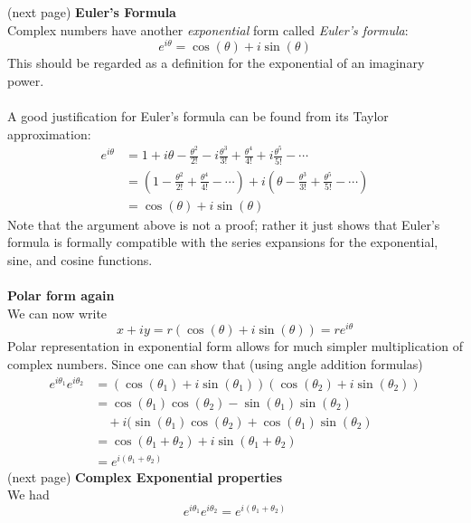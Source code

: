 \documentclass{report}
\begin{document}
(next page)
\newpage
\noindent\textbf{Euler's Formula}\\
Complex numbers have another \textit{exponential} form called \textit{Euler's formula}:
\begin{equation*}
e^{i\theta}=\cos(\theta)+i\sin(\theta)
\end{equation*}
This should be regarded as a definition for the exponential of an imaginary power.\\
\vspace{1mm}\\
A good justification for Euler's formula can be found from
its Taylor approximation:
\begin{align*}
e^{i\theta}&=1+i\theta-\frac{\theta^2}{2!}-i\frac{\theta^3}{3!}+\frac{\theta^4}{4!}+i\frac{\theta^5}{5!}-\cdots\\
&=\left(1-\frac{\theta^2}{2!}+\frac{\theta^4}{4!}-\cdots\right)+i\left(\theta-\frac{\theta^3}{3!}
+\frac{\theta^5}{5!}-\cdots\right)\\
&=\cos(\theta)+i\sin(\theta)
\end{align*}
Note that the argument above is not a proof; rather it just shows that Euler's formula is formally compatible with
the series expansions for the exponential, sine, and cosine functions.\\
\vspace{1mm}\\
\textbf{Polar form again}\\
We can now write
\begin{equation*}
x+iy=r(\cos(\theta)+i\sin(\theta))=re^{i\theta}
\end{equation*}
Polar representation in exponential form allows for much simpler multiplication of complex numbers. Since one can
show that (using angle addition formulas)
\begin{align*}
e^{i\theta_1}e^{i\theta_2}&=(\cos(\theta_1)+i\sin(\theta_1))(\cos(\theta_2)+i\sin(\theta_2))\\
&=\cos(\theta_1)\cos(\theta_2)-\sin(\theta_1)\sin(\theta_2)\\&\quad+i(\sin(\theta_1)\cos(\theta_2)+\cos(\theta_1)\sin(\theta_2)\\
&=\cos(\theta_1+\theta_2)+i\sin(\theta_1+\theta_2)\\
&=e^{i(\theta_1+\theta_2)}
\end{align*}
(next page)
\newpage
\noindent\textbf{Complex Exponential properties}\\
We had
\begin{equation*}
e^{i\theta_1}e^{i\theta_2}=e^{i(\theta_1+\theta_2)}
\end{equation*}
\end{document}
